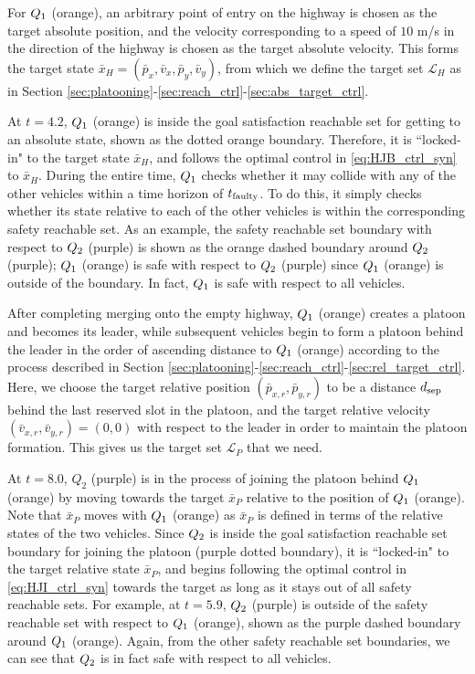 For $Q_{1}$ (orange), an arbitrary point of entry on the highway is chosen as the target absolute position, and the velocity corresponding to a speed of $10$ m/s in the direction of the highway is chosen as the target absolute velocity. This forms the target state $\bar{x}_H=(\bar{p}_x, \bar{v}_x, \bar{p}_y, \bar{v}_y)$, from which we define the target set $\mathcal{L}_H$ as in Section \ref{sec:platooning}-\ref{sec:reach_ctrl}-\ref{sec:abs_target_ctrl}.

At $t=4.2$, $Q_{1}$ (orange) is inside the goal satisfaction reachable set for getting to an absolute state, shown as the dotted orange boundary. Therefore, it is ``locked-in" to the target state $\bar{x}_H$, and follows the optimal control in \eqref{eq:HJB_ctrl_syn} to $\bar{x}_H$. During the entire time, $Q_{1}$ checks whether it may collide with any of the other vehicles within a time horizon of $t_\text{faulty}$. To do this, it simply checks whether its state relative to each of the other vehicles is within the corresponding safety reachable set. As an example, the safety reachable set boundary with respect to $Q_{2}$ (purple) is shown as the orange dashed boundary around $Q_{2}$ (purple); $Q_{1}$ (orange) is safe with respect to $Q_{2}$ (purple) since $Q_{1}$ (orange) is outside of the boundary. In fact, $Q_{1}$ is safe with respect to all vehicles.

After completing merging onto the empty highway, $Q_{1}$ (orange) creates a platoon and becomes its leader, while subsequent vehicles begin to form a platoon behind the leader in the order of ascending distance to $Q_{1}$ (orange) according to the process described in Section \ref{sec:platooning}-\ref{sec:reach_ctrl}-\ref{sec:rel_target_ctrl}. Here, we choose the target relative position $(\bar{p}_{x,r}, \bar{p}_{y,r})$ to be a distance $d_\text{sep}$ behind the last reserved slot in the platoon, and the target relative velocity $(\bar{v}_{x,r}, \bar{v}_{y,r}) = (0,0)$ with respect to the leader in order to maintain the platoon formation. This gives us the target set $\mathcal{L}_P$ that we need.

At $t=8.0$, $Q_2$ (purple) is in the process of joining the platoon behind $Q_{1}$ (orange) by moving towards the target $\bar{x}_P$ relative to the position of $Q_{1}$ (orange). Note that $\bar{x}_P$ moves with $Q_{1}$ (orange) as $\bar{x}_P$ is defined in terms of the relative states of the two vehicles. Since $Q_{2}$ is inside the goal satisfaction reachable set boundary for joining the platoon (purple dotted boundary), it is ``locked-in" to the target relative state $\bar{x}_P$, and begins following the optimal control in \eqref{eq:HJI_ctrl_syn} towards the target as long as it stays out of all safety reachable sets. For example, at $t=5.9$, $Q_{2}$ (purple) is outside of the safety reachable set with respect to $Q_{1}$ (orange), shown as the purple dashed boundary around $Q_{1}$ (orange). Again, from the other safety reachable set boundaries, we can see that $Q_{2}$ is in fact safe with respect to all vehicles.

